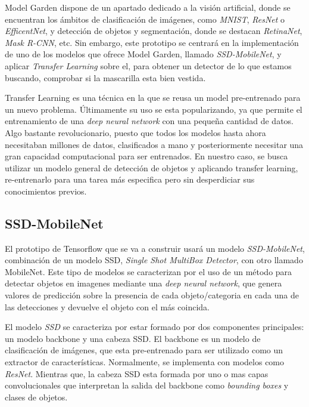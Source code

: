 Model Garden dispone de un apartado dedicado a la visión artificial, donde se encuentran los ámbitos de clasificación de imágenes, como \textit{MNIST}, \textit{ResNet} o \textit{EfficentNet}, y detección de objetos y segmentación, donde se destacan \textit{RetinaNet}, \textit{Mask R-CNN}, etc. Sin embargo, este prototipo se centrará en la implementación de uno de los modelos que ofrece Model Garden, llamado \textit{SSD-MobileNet}, y aplicar \textit{Transfer Learning} sobre el, para obtener un detector de lo que estamos buscando, comprobar si la mascarilla esta bien vestida.

Transfer Learning es una técnica en la que se reusa un model pre-entrenado para un nuevo problema. Últimamente su uso se esta popularizando, ya que permite el entrenamiento de una \textit{deep neural network} con una pequeña cantidad de datos. Algo bastante revolucionario, puesto que todos los modelos hasta ahora necesitaban millones de datos, clasificados a mano y posteriormente necesitar una gran capacidad computacional para ser entrenados.\cite{transferLearning} En nuestro caso, se busca utilizar un modelo general de detección de objetos y aplicando transfer learning, re-entrenarlo para una tarea más especifica pero sin desperdiciar sus conocimientos previos.

\subsection*{SSD-MobileNet}

El prototipo de Tensorflow que se va a construir usará un modelo \textit{SSD-MobileNet}, combinación de un modelo SSD, \textit{Single Shot MultiBox Detector}, con otro llamado MobileNet. Este tipo de modelos se caracterizan por el uso de un método para detectar objetos en imagenes mediante una \textit{deep neural network}, que genera valores de predicción sobre la presencia de cada objeto/categoria en cada una de las detecciones y devuelve el objeto con el más coincida.

El modelo \textit{SSD} se caracteriza por estar formado por dos componentes principales: un modelo backbone y una cabeza SSD. El backbone es un modelo de clasificación de imágenes, que esta pre-entrenado para ser utilizado como un extractor de características. Normalmente, se implementa con modelos como \textit{ResNet}. Mientras que, la cabeza SSD esta formada por uno o mas capas convolucionales que interpretan la salida del backbone como \textit{bounding boxes} y clases de objetos. \cite{ssdwork}

